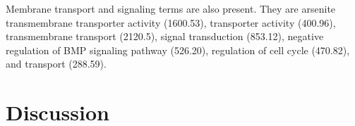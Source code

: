 Membrane transport and signaling terms are also present.
%
They are arsenite transmembrane transporter activity (1600.53), transporter activity (400.96), transmembrane transport (2120.5), signal transduction (853.12), negative regulation of BMP signaling pathway (526.20), regulation of cell cycle (470.82), and transport (288.59).








\section{Discussion} \label{chap:4-sec:discussion}




